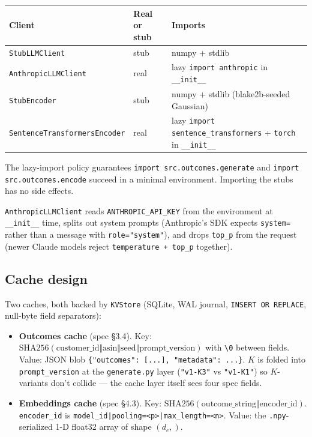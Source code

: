 \documentclass[11pt,a4paper]{article}
\begin{document}
\begin{center}
\small
\begin{tabular}{@{}l l l@{}}
\toprule
Client & Real or stub & Imports \\
\midrule
\texttt{StubLLMClient}                 & stub & numpy + stdlib \\
\texttt{AnthropicLLMClient}            & real & lazy \texttt{import anthropic} in \texttt{\_\_init\_\_} \\
\texttt{StubEncoder}                   & stub & numpy + stdlib (blake2b-seeded Gaussian) \\
\texttt{SentenceTransformersEncoder}   & real & lazy \texttt{import sentence\_transformers} + \texttt{torch} in \texttt{\_\_init\_\_} \\
\bottomrule
\end{tabular}
\end{center}

The lazy-import policy guarantees \texttt{import src.outcomes.generate}
and \texttt{import src.outcomes.encode} succeed in a minimal
environment. Importing the stubs has no side effects.

\texttt{AnthropicLLMClient} reads \texttt{ANTHROPIC\_API\_KEY} from the
environment at \texttt{\_\_init\_\_} time, splits out system prompts
(Anthropic's SDK expects \texttt{system=} rather than a message with
\texttt{role="system"}), and drops \texttt{top\_p} from the request
(newer Claude models reject \texttt{temperature + top\_p} together).

\subsection{Cache design}

Two caches, both backed by \texttt{KVStore} (SQLite, WAL journal,
\texttt{INSERT OR REPLACE}, null-byte field separators):

\begin{itemize}
\item \textbf{Outcomes cache} (spec \S 3.4). Key:
$\mathrm{SHA256}(\text{customer\_id} \Vert \text{asin} \Vert
\text{seed} \Vert \text{prompt\_version})$ with \texttt{\textbackslash 0}
between fields. Value: JSON blob
\texttt{\{"outcomes": [...], "metadata": {...}\}}. $K$ is folded
into \texttt{prompt\_version} at the \texttt{generate.py} layer
(\texttt{"v1-K3"} vs \texttt{"v1-K1"}) so $K$-variants don't
collide — the cache layer itself sees four spec fields.
\item \textbf{Embeddings cache} (spec \S 4.3). Key:
$\mathrm{SHA256}(\text{outcome\_string} \Vert \text{encoder\_id})$.
\texttt{encoder\_id} is
\texttt{model\_id|pooling=<p>|max\_length=<n>}. Value: the
\texttt{.npy}-serialized 1-D float32 array of shape $(d_e,)$.
\end{itemize}
\end{document}
